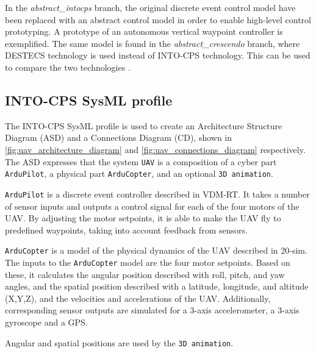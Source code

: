 		In the \emph{abstract\_intocps} branch, the original discrete event control model have been replaced with an abstract control model in order to enable high-level control prototyping.
		A prototype of an autonomous vertical waypoint controller is exemplified.
		The same model is found in the \emph{abstract\_crescendo} branch, where DESTECS technology is used instead of INTO-CPS technology.
		This can be used to compare the two technologies \cite{Thule&16b}.

	\subsection{INTO-CPS SysML profile}
	\label{sec:uavsingle_into_sys}
		The INTO-CPS SysML profile is used to create an Architecture Structure Diagram (ASD) and a Connections Diagram (CD), shown in \autoref{fig:uav_architecture_diagram} and \autoref{fig:uav_connections_diagram} respectively.
		The ASD expresses that the system \texttt{UAV} is a composition of a cyber part \texttt{ArduPilot}, a physical part \texttt{ArduCopter}, and an optional \texttt{3D animation}.

		\texttt{ArduPilot} is a discrete event controller described in VDM-RT. 
		It takes a number of sensor inputs and outputs a control signal for each of the four motors of the UAV.
		By adjusting the motor setpoints, it is able to make the UAV fly to predefined waypoints, taking into account feedback from sensors.

		\texttt{ArduCopter} is a model of the physical dynamics of the UAV described in 20-sim.
		The inputs to the \texttt{ArduCopter} model are the four motor setpoints. 
		Based on these, it calculates the angular position described with roll, pitch, and yaw angles, and the spatial position described with a latitude, longitude, and altitude (X,Y,Z), and the velocities and accelerations of the UAV.
		Additionally, corresponding sensor outputs are simulated for a 3-axis accelerometer, a 3-axis gyroscope and a GPS. 
		
		Angular and spatial positions are used by the \texttt{3D animation}.

